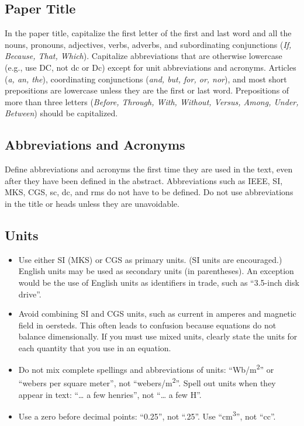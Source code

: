 \documentclass [a4paper,final,conference,10pt]{IDAACS}
\begin{document}
\subsection{Paper Title}
In the paper title, capitalize the first letter of the first and 
last word and all the nouns, pronouns, adjectives, verbs, adverbs, 
and subordinating conjunctions (\textit{If, Because, That, Which}). 
Capitalize abbreviations that are otherwise lowercase (e.g., use DC, not dc or 
Dc) except for unit abbreviations and acronyms. Articles (\textit{a, an, the}),
coordinating conjunctions (\textit{and, but, for, or, nor}), and most short 
prepositions are lowercase unless they are the first or last word. Prepositions
of more than three letters (\textit{Before, Through, With, Without, Versus, 
Among, Under, Between}) should be capitalized.

\subsection{Abbreviations and Acronyms}

Define abbreviations and acronyms the first time they are used in the text, 
even after they have been defined in the abstract. Abbreviations such as 
IEEE, SI, MKS, CGS, sc, dc, and rms do not have to be defined. Do not use 
abbreviations in the title or heads unless they are unavoidable.

\subsection{Units}
\begin{itemize}
\item {Use either SI (MKS) or CGS as primary units. (SI units are 
encouraged.) English units may be used as secondary units (in parentheses).
An exception would be the use of English units as identifiers in trade, 
such as ``3.5-inch disk drive''.}
\item {Avoid combining SI and CGS units, such as current in amperes and 
magnetic field in oersteds. This often leads to confusion because equations
do not balance dimensionally. If you must use mixed units, clearly state the
units for each quantity that you use in an equation.}
\item {Do not mix complete spellings and abbreviations of units: 
``Wb/m\textsuperscript{2}'' or ``webers per square meter'', not 
``webers/m\textsuperscript{2}''.  Spell out units when they appear in 
text: ``\ldots{} a few henries'', not ``\ldots{} a few H''.}
\item {Use a zero before decimal points: ``0.25'', not ``.25''. Use 
``cm\textsuperscript{3}'', not ``cc''.}
\end{itemize}
\end{document}
